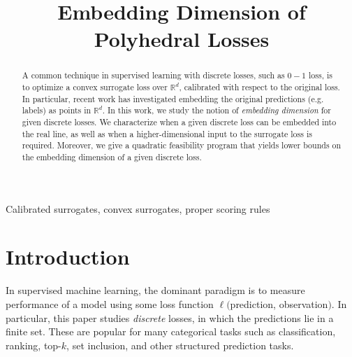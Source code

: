 \documentclass[anon]{colt2020} %
\title[Embedding dimension]{Embedding Dimension of Polyhedral Losses}
\newcommand{\reals}{\mathbb{R}}
\newcommand{\Ind}[1]{\mathbf{1}\{#1\}}
\begin{document}
\maketitle

\begin{abstract}%
  A common technique in supervised learning with discrete losses, such as $0-1$ loss, is to optimize a convex surrogate loss over $\reals^d$, calibrated with respect to the original loss.
  In particular, recent work has investigated embedding the original predictions (e.g. labels) as points in $\reals^d$.
  In this work, we study the notion of \emph{embedding dimension} for given discrete losses.
  We characterize when a given discrete loss can be embedded into the real line, as well as when a higher-dimensional input to the surrogate loss is required.
  Moreover, we give a quadratic feasibility program that yields lower bounds on the embedding dimension of a given discrete loss.
\end{abstract}

\begin{keywords}%
  Calibrated surrogates, convex surrogates, proper scoring rules%
\end{keywords}


\section{Introduction}
In supervised machine learning, the dominant paradigm is to measure performance of a model using some loss function $\ell($prediction, observation$)$.
In particular, this paper studies \emph{discrete} losses, in which the predictions lie in a finite set.
These are popular for many categorical tasks such as classification, ranking, top-$k$, set inclusion, and other structured prediction tasks.
\end{document}
